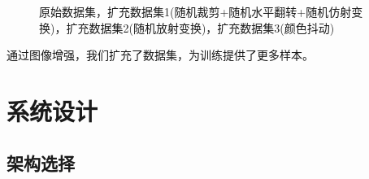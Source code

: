 \documentclass[hyperref, UTF8, 12pt]{article}
\theoremstyle{definition}
\begin{document}
\begin{figure}[H]
	\centering
	\caption{原始数据集，扩充数据集1(随机裁剪+随机水平翻转+随机仿射变换)，扩充数据集2(随机放射变换)，扩充数据集3(颜色抖动)}
\end{figure}
通过图像增强，我们扩充了数据集，为训练提供了更多样本。
\section{系统设计}
\subsection{架构选择}
\end{document}
